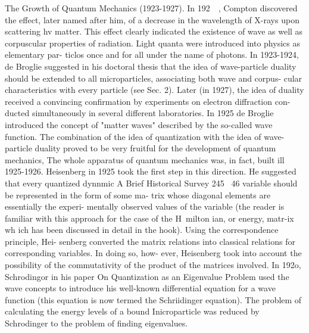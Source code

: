 \documentclass[a4paper,sfsidenotes,colorlinks=true]{tufte-book}
\numberwithin{equation}{section}
\numberwithin{figure}{section}
\begin{document}
{{{{{{The Growth of Quantum Mechanics (1923-1927). In 192~~, Compton discovered the effect, later named after him, of a decrease in the wavelength of X-rays upon scattering hv matter. This effect clearly indicated the existence of wave as well as corpuscular properties of radiation. Light quanta were introduced into physics as elementary par- ticlos once and for all under the name of photons.
In 1923-1924, de Broglie suggested in his doctoral thesis that the idea of wave-particle duality should be extended to all microparticles, associating both wave and corpus- cular characteristics with every particle (see Sec. 2). Later (in 1927), the idea of duality received a convincing confirmation by experiments on electron diffraction con- ducted simultaneously in several different laboratories. In 1925 de Broglie introduced the concept of "matter waves" described by the so-called wave function.
The combination of the idea of quantization with the idea of wave-particle duality proved to be very fruitful for the development of quantum mechanics, The whole apparatus of quantum mechanics was, in fact, built ill 1925-1926. Heisenberg in 1925 took the first step in this direction. He suggested that every quantized dynnmic
A Brief Historical Survey
245
~46
variable should be represented in the form of some ma- trix whose diagonal elements are essentially the experi- mentally observed values of the variable (the reader is familiar with this approach for the case of the H~milton­ ian, or energy, matr-ix wh ich has been discussed in detail in the hook). Using the correspondence principle, Hei- senberg converted the matrix relations into classical relations for corresponding variables. In doing so, how- ever, Heisenberg took into account the possibility of the commutativity of the product of the matrices involved. In 192o, Schrodingor in his paper On Quantization as an Eigenvalue Problem used the wave concepts to introduce his well-known differential equation for a wave function (this equation is now termed the Schriidinger equation). The problem of calculating the energy levels of a bound Inicroparticle was reduced by Schrodinger to the problem of finding eigenvalues.
}}}}}}
\end{document}
